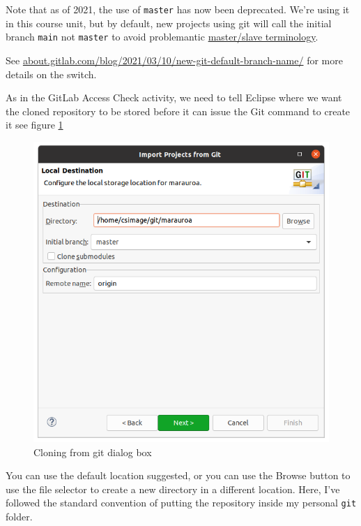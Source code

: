 \documentclass[
]{book}
\begin{document}
Note that as of 2021, the use of \texttt{master} has now been deprecated. We're using it in this course unit, but by default, new projects using git will call the initial branch \texttt{main} not \texttt{master} to avoid problemantic \href{https://en.wikipedia.org/wiki/Master/slave_(technology)}{master/slave terminology}.

See \href{https://about.gitlab.com/blog/2021/03/10/new-git-default-branch-name/}{about.gitlab.com/blog/2021/03/10/new-git-default-branch-name/} for more details on the switch.

As in the GitLab Access Check activity, we need to tell Eclipse where we want the cloned repository to be stored before it can issue the Git command to create it see figure \ref{fig:configureLocalStorageMarauroa-fig}

\begin{figure}

{\centering \includegraphics[width=1\linewidth]{images/1.4configureLocalStorageMarauroa} 

}

\caption{Cloning from git dialog box}\label{fig:configureLocalStorageMarauroa-fig}
\end{figure}

You can use the default location suggested, or you can use the Browse button to use the file selector to create a new directory in a different location. Here, I've followed the standard convention of putting the repository inside my personal \texttt{git} folder.
\end{document}
